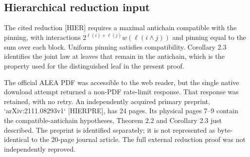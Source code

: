 \documentclass[10pt]{article}
\begin{document}
\subsection*{Hierarchical reduction input}
The cited reduction [HIER] requires a maximal antichain compatible with the pinning, with interactions \(2^{\ell(i)+\ell(j)}w(\ell(i\wedge j))\) and pinning equal to the sum over each block. Uniform pinning satisfies compatibility. Corollary 2.3 identifies the joint law at leaves that remain in the antichain, which is the property used for the distinguished leaf in the present proof.\par
The official ALEA PDF was accessible to the web reader, but the single native download attempt returned a non-PDF rate-limit response. That response was retained, with no retry. An independently acquired primary preprint, `arXiv:2111.08293v1` [HIERPRE], has 24 pages. Its physical pages 7–9 contain the compatible-antichain hypotheses, Theorem 2.2 and Corollary 2.3 just described. The preprint is identified separately; it is not represented as byte-identical to the 20-page journal article. The full external reduction proof was not independently reproved.\par
\end{document}
